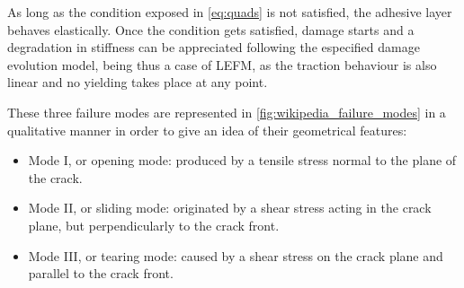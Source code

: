 \documentclass[cmfonts]{witpress}
\begin{document}
As long as the condition exposed in \cref{eq:quads} is not satisfied, the adhesive layer behaves elastically. Once the condition gets satisfied, damage starts and a degradation in stiffness can be appreciated following the especified damage evolution model, being thus a case of LEFM, as the traction behaviour is also linear and no yielding takes place at any point.

These three failure modes are represented in \cref{fig:wikipedia_failure_modes} in a qualitative manner in order to give an idea of their geometrical features:
\begin{itemize}
	\item Mode I, or opening mode: produced by a tensile stress normal to the plane of the crack.

	\item Mode II, or sliding mode: originated by a shear stress acting in the crack plane, but perpendicularly to the crack front.

	\item Mode III, or tearing mode: caused by a shear stress on the crack plane and parallel to the crack front.
\end{itemize}
\end{document}
